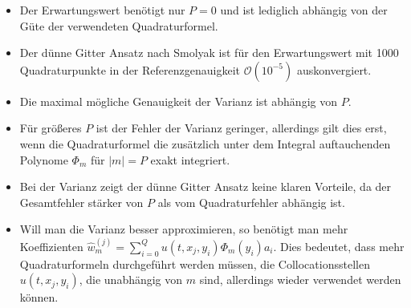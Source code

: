 \begin{itemize}
\item Der Erwartungswert benötigt nur $P=0$ und ist lediglich abhängig von der Güte der verwendeten Quadraturformel.
\item Der dünne Gitter Ansatz nach Smolyak ist für den Erwartungswert mit 1000 Quadraturpunkte in der Referenzgenauigkeit $\mathcal{O}(10^{-5})$ auskonvergiert.
\item Die maximal mögliche Genauigkeit der Varianz ist abhängig von $P$. 
\item Für größeres $P$ ist der Fehler der Varianz geringer, allerdings gilt dies erst, wenn die Quadraturformel die zusätzlich unter dem Integral auftauchenden Polynome $\Phi_m$ für $|m|=P$ exakt integriert.
\item Bei der Varianz zeigt der dünne Gitter Ansatz keine klaren Vorteile, da der Gesamtfehler stärker von $P$ als vom Quadraturfehler abhängig ist.
\item Will man die Varianz besser approximieren, so benötigt man mehr Koeffizienten $\hat{w}_m^{(j)}=\sum_{i=0}^Qu(t,x_j,y_i)\Phi_m(y_i)a_i$. Dies bedeutet, dass mehr Quadraturformeln durchgeführt werden müssen, die Collocationsstellen $u(t,x_j,y_i)$, die unabhängig von $m$ sind, allerdings wieder verwendet werden können.
\end{itemize} 

